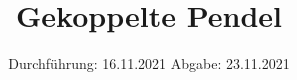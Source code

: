 

\subject{V106}
\title{Gekoppelte Pendel}
\date{%
  Durchführung: 16.11.2021
  \hspace{3em}
  Abgabe: 23.11.2021
}



\maketitle
\thispagestyle{empty}
\tableofcontents
\newpage




\newpage




\newpage

\printbibliography{}


